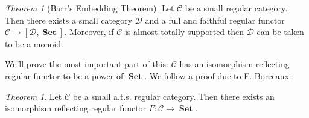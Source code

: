 \documentclass[a4paper]{article}
\theoremstyle{definition}
\theoremstyle{remark}
\theoremstyle{default}
\newtheorem{theorem}[definition]{Theorem}
\numberwithin{definition}{section}
\DeclareMathOperator{\Set}{\textbf{Set}}
\begin{document}
\begin{theorem}[Barr's Embedding Theorem]
	Let $\mathcal{C}$ be a small regular category.
	Then there exists a small category $\mathcal{D}$ and a full and faithful regular functor $\mathcal{C} \to [\mathcal{D}, \Set]$.
	Moreover, if $\mathcal{C}$ is almost totally supported then $\mathcal{D}$ can be taken to be a monoid.
\end{theorem}

We'll prove the most important part of this:
$\mathcal{C}$ has an isomorphism reflecting regular functor to be a power of $\Set$.
We follow a proof due to F. Borceaux:

\begin{theorem}
	Let $\mathcal{C}$ be a small a.t.s. regular category.
	Then there exists an isomorphism reflecting regular functor $F: \mathcal{C} \to \Set$.
\end{theorem}
\end{document}
